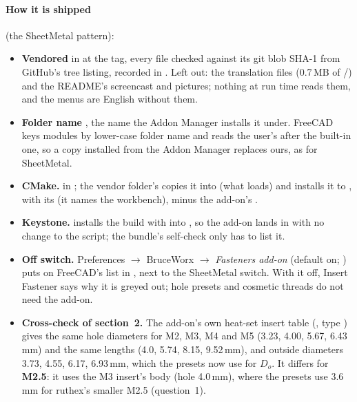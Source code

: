 \paragraph{How it is shipped} (the SheetMetal pattern):
\begin{itemize}[nosep]
  \item \textbf{Vendored} in  at the tag, every file checked against
        its git blob SHA-1 from GitHub's tree listing, recorded in . Left out: the translation
        files (0.7\,MB of /) and the README's screencast and pictures; nothing at run time
        reads them, and the menus are English without them.
  \item \textbf{Folder name} , the name the Addon Manager installs it under. FreeCAD keys modules
        by lower-case folder name and reads the user's  after the built-in one, so a copy installed
        from the Addon Manager replaces ours, as for SheetMetal.
  \item \textbf{CMake.}  in ; the
        vendor folder's  copies it into  (what
         loads) and installs it to , with its
         (it names the workbench), minus the add-on's .
  \item \textbf{Keystone.}  installs the build with  into
        , so the add-on lands in  with no change to the
        script; the bundle's self-check only has to list it.
  \item \textbf{Off switch.} Preferences $\rightarrow$ BruceWorx $\rightarrow$ \emph{Fasteners add-on} (default
        on; ) puts  on FreeCAD's  list in
        , next to the SheetMetal switch. With it off, Insert Fastener says why it is
        greyed out; hole presets and cosmetic threads do not need the add-on.
  \item \textbf{Cross-check of section~2.} The add-on's own heat-set insert table (,
        type ) gives the same hole diameters for M2, M3, M4 and M5 (3.23, 4.00, 5.67,
        6.43\,mm) and the same lengths (4.0, 5.74, 8.15, 9.52\,mm), and outside diameters 3.73, 4.55, 6.17,
        6.93\,mm, which the presets now use for $D_o$. It differs for \textbf{M2.5}: it uses the M3 insert's body
        (hole 4.0\,mm), where the presets use 3.6\,mm for ruthex's smaller M2.5 (question~1).
\end{itemize}

